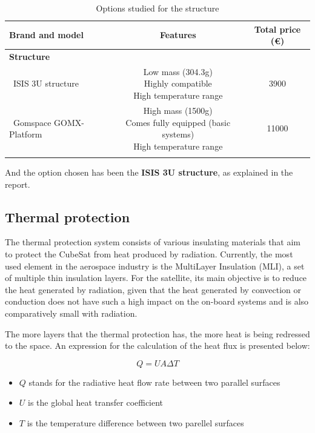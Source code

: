 \begin{longtable}{| l | c | c | }
\hline
\rowcolor[gray]{0.80}	\textbf{Brand and model} &  \textbf{Features}     & \textbf{Total price (\euro)}   \\
\hline
\endfirsthead

\rowcolor[gray]{0.85} \textbf{Structure} &  &  \\
	   ~ISIS 3U structure & \makecell{Low mass (304.3g) \\ Highly compatible \\ High temperature range} & 3900 \\
	   \hline
	   ~Gomspace GOMX-Platform & \makecell{High mass (1500g) \\ Comes fully equipped (basic systems) \\ High temperature range} & 11000 \\
	   \hline
\caption{Options studied for the structure}
\label{structureoptions}
\end{longtable}

And the option chosen has been the \textbf{ISIS 3U structure}, as explained in the report.

\subsection{Thermal protection}
The thermal protection system consists of various insulating materials that aim to protect the CubeSat from heat produced by radiation. Currently, the most used element in the aerospace industry is the MultiLayer Insulation (MLI), a set of multiple thin insulation layers. For the satellite, its main objective is to reduce the heat generated by radiation, given that the heat generated by convection or conduction does not have such a high impact on the on-board systems and is also comparatively small with radiation. 

The more layers that the thermal protection has, the more heat is being redressed to the space. An expression for the calculation of the heat flux is presented below:

\begin{equation}
Q=UA\Delta T
\label{eqheatbasic}
\end{equation}

\begin{itemize}
\item $Q$ stands for the radiative heat flow rate between two parallel surfaces
\item $U$ is the global heat transfer coefficient
\item $T$ is the temperature difference between two parellel surfaces
\end{itemize}

